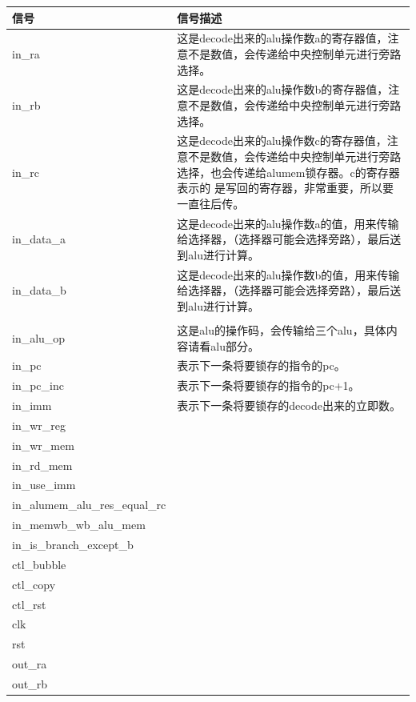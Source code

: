 \begin{center}
    \label{table:idalu}
    \begin{longtable}{p{}p{}}
        \toprule
        信号 & 信号描述 \\
        \midrule
        in\_ra  & 这是decode出来的alu操作数a的寄存器值，注意不是数值，会传递给中央控制单元进行旁路选择。 \\
        in\_rb &  这是decode出来的alu操作数b的寄存器值，注意不是数值，会传递给中央控制单元进行旁路选择。\\
        in\_rc &  这是decode出来的alu操作数c的寄存器值，注意不是数值，会传递给中央控制单元进行旁路选择，也会传递给alumem锁存器。c的寄存器表示的
        是写回的寄存器，非常重要，所以要一直往后传。\\
        in\_data\_a &  这是decode出来的alu操作数a的值，用来传输给选择器，（选择器可能会选择旁路），最后送到alu进行计算。 \\
        in\_data\_b &  这是decode出来的alu操作数b的值，用来传输给选择器，（选择器可能会选择旁路），最后送到alu进行计算。 \\\\
        in\_alu\_op &  这是alu的操作码，会传输给三个alu，具体内容请看alu部分。\\
        in\_pc &  表示下一条将要锁存的指令的pc。\\
        in\_pc\_inc &  表示下一条将要锁存的指令的pc+1。\\
        in\_imm &  表示下一条将要锁存的decode出来的立即数。\\
        in\_wr\_reg &  \\
        in\_wr\_mem &  \\
        in\_rd\_mem &  \\
        in\_use\_imm &  \\
        in\_alumem\_alu\_res\_equal\_rc &  \\
        in\_memwb\_wb\_alu\_mem &  \\
        in\_is\_branch\_except\_b &  \\
        ctl\_bubble &  \\
        ctl\_copy &  \\
        ctl\_rst &  \\
        clk &  \\
        rst &  \\
        out\_ra &  \\
        out\_rb &  \\

\end{longtable}
\end{center}
